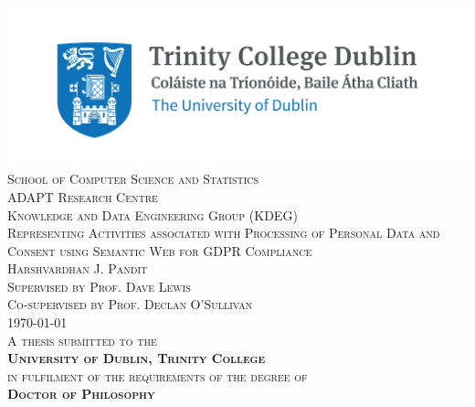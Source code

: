 \pagestyle{empty}
\begin{center}
\scshape
    \includegraphics{img/TCD_logo.png}\\[1cm] 
\large School of Computer Science and Statistics \\[0.25cm]
\small ADAPT Research Centre \\
\small Knowledge and Data Engineering Group (KDEG) \\[1.5cm]

\huge Representing Activities associated with Processing of Personal Data and Consent using Semantic Web for GDPR Compliance \\[1.5cm]
 
\Large Harshvardhan J. Pandit \\[1cm]

\large 
Supervised by Prof. Dave Lewis \\
Co-supervised by Prof. Declan O'Sullivan \\[1cm]

{\small \today}\\[2cm]

\normalsize
A thesis submitted to the \\
\textbf{University of Dublin, Trinity College} \\
in fulfilment of the requirements of the degree of \\
\textbf{Doctor of Philosophy}

\normalsize

\vfill %
\end{center}
\restoregeometry